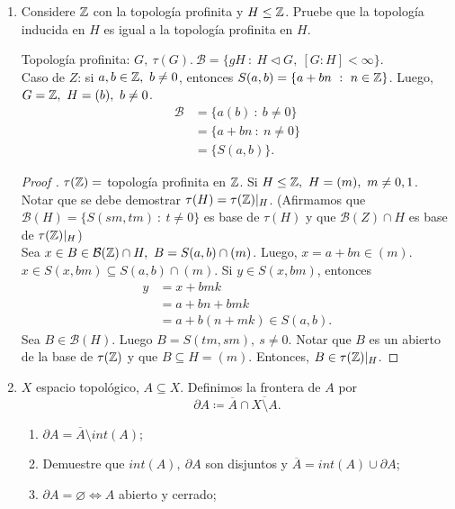 \documentclass[a4paper]{report}
\begin{document}
\begin{enumerate}
	\item Considere $\mathbb{Z}$ con la topología profinita y $H \leq \mathbb{Z}$. Pruebe que la topología inducida en $H$ es igual a la topología profinita en $H$.
	\begin{remark}
		Topología profinita: $G,\ \tau (G).\ \mathcal{B} = \{ gH \ : \ H \lhd G, \ [G : H] < \infty \}$. \\
		\noindent Caso de $Z$: si $a,b \in \mathbb{Z},\ b\neq 0$, entonces $S(a,b) = \{ a+bn \ : \ n \in \mathbb{Z} \}$. Luego, $G = \mathbb{Z},\ H = (b),\ b\neq 0$.
		\begin{align*}
			\mathcal{B} & = \{ a(b) \ : \ b \neq 0 \} \\
			& = \{ a+bn \ : \ n \neq 0 \} \\
			& = \{ S(a,b) \}  
		.\end{align*}
	\end{remark}
	\begin{proof}[Proof ]
		$\tau (\mathbb{Z}) =$ topología profinita en $\mathbb{Z}$. Si $H \leq \mathbb{Z},\ H = (m),\ m \neq 0,1$. Notar que se debe demostrar $\tau (H) = \tau (\mathbb{Z})|_{H}$. (Afirmamos que $\mathcal{B}(H) = \{ S(sm,tm) \ : \ t \neq 0 \}$ es base de $\tau (H)$ y que $\mathcal{B}(Z) \cap H$ es base de $\tau(\mathbb{Z})|_{H}$) \\
		\noindent \fbox{$\supseteq$} Sea $x \in  B \in \mathcal{B}(\mathbb{Z}) \cap H,\ B = S(a,b) \cap (m)$. Luego, $x = a + bn \in (m)$. $x \in S(x,bm) \subseteq S(a,b) \cap (m)$. Si $y \in S(x,bm)$, entonces
		\begin{align*}
			y & = x + bmk \\
			& = a + bn + bmk \\
			& = a + b(n+mk) \in S(a,b)
		.\end{align*}
		\noindent \fbox{$\subseteq$} Sea $B \in \mathcal{B}(H)$. Luego $B= S(tm,sm),\ s \neq 0$. Notar que $B$ es un abierto de la base de $\tau(\mathbb{Z})$ y que $B \subseteq H = (m)$. Entonces, $B \in \tau (\mathbb{Z})|_{H}$.
	\end{proof}

	\item $X$ espacio topológico, $A \subseteq X$. Definimos la frontera de $A$ por
	\[
	\partial A \coloneq \overline{A} \cap \overline{X \setminus A}.
	\]
	\begin{enumerate}
		\item $\partial A = \overline{A} \setminus int(A)$;

		\item Demuestre que $int(A),\ \partial A$ son disjuntos y $\overline{A} = int(A) \cup \partial A$;

		\item $\partial A = \varnothing \iff A$ abierto y cerrado;


\end{enumerate}
\end{enumerate}
\end{document}

